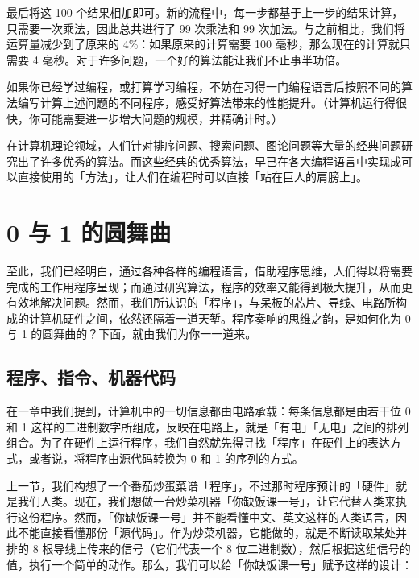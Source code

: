 最后将这 100 个结果相加即可。新的流程中，每一步都基于上一步的结果计算，只需要一次乘法，因此总共进行了 99 次乘法和 99 次加法。与之前相比，我们将运算量减少到了原来的 4\%：如果原来的计算需要 100 毫秒，那么现在的计算就只需要 4 毫秒。对于许多问题，一个好的算法能让我们不止事半功倍。

\begin{note}
  如果你已经学过编程，或打算学习编程，不妨在习得一门编程语言后按照不同的算法编写计算上述问题的不同程序，感受好算法带来的性能提升。（计算机运行得很快，你可能需要进一步增大问题的规模，并精确计时。）
\end{note}

在计算机理论领域，人们针对排序问题、搜索问题、图论问题等大量的经典问题研究出了许多优秀的算法。而这些经典的优秀算法，早已在各大编程语言中实现成可以直接使用的「方法」，让人们在编程时可以直接「站在巨人的肩膀上」。

\section{0 与 1 的圆舞曲}

至此，我们已经明白，通过各种各样的编程语言，借助程序思维，人们得以将需要完成的工作用程序呈现；而通过研究算法，程序的效率又能得到极大提升，从而更有效地解决问题。然而，我们所认识的「程序」，与呆板的芯片、导线、电路所构成的计算机硬件之间，依然还隔着一道天堑。程序奏响的思维之韵，是如何化为 0 与 1 的圆舞曲的？下面，就由我们为你一一道来。

\subsection{程序、指令、机器代码}

在一章中我们提到，计算机中的一切信息都由电路承载：每条信息都是由若干位 0 和 1 这样的二进制数字所组成，反映在电路上，就是「有电」「无电」之间的排列组合。为了在硬件上运行程序，我们自然就先得寻找「程序」在硬件上的表达方式，或者说，将程序由源代码转换为 0 和 1 的序列的方式。

上一节，我们构想了一个番茄炒蛋菜谱「程序」，不过那时程序预计的「硬件」就是我们人类。现在，我们想做一台炒菜机器「你缺饭课一号」，让它代替人类来执行这份程序。然而，「你缺饭课一号」并不能看懂中文、英文这样的人类语言，因此不能直接看懂那份「源代码」。作为炒菜机器，它能做的，就是不断读取某处并排的 8 根导线上传来的信号（它们代表一个 8 位二进制数），然后根据这组信号的值，执行一个简单的动作。那么，我们可以给「你缺饭课一号」赋予这样的设计：

